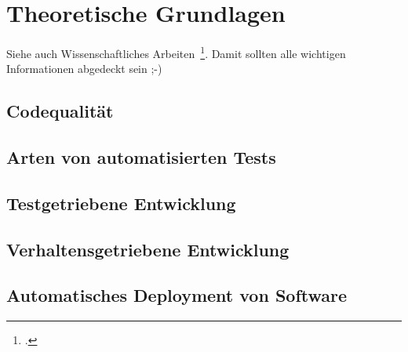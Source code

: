\newpage
\section{Theoretische Grundlagen}
Siehe auch Wissenschaftliches Arbeiten~\footcite[Vgl. ][Seite 1]{Balzert.2008}. Damit sollten alle wichtigen Informationen abgedeckt sein ;-)

\subsection{Codequalität}
\subsection{Arten von automatisierten Tests}
\subsection{Testgetriebene Entwicklung}
\subsection{Verhaltensgetriebene Entwicklung}
\subsection{Automatisches Deployment von Software}
